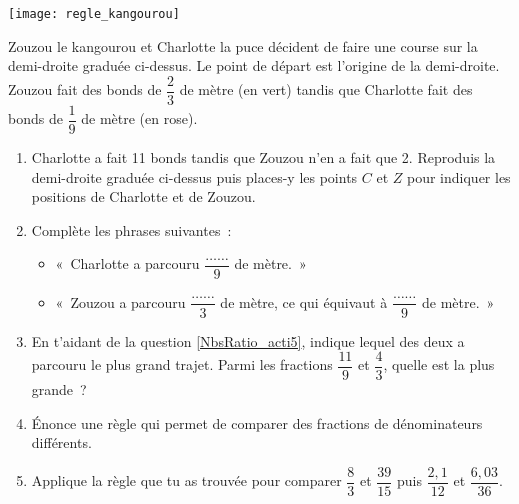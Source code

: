 \begin{activite}

\begin{center} \texttt{[image: regle\_kangourou]} \end{center}

Zouzou le kangourou et Charlotte la puce décident de faire une course sur la demi-droite graduée ci-dessus. Le point de départ est l'origine de la demi-droite. Zouzou fait des bonds de $\dfrac{2}{3}$ de mètre (en vert) tandis que Charlotte fait des bonds de $\dfrac{1}{9}$ de mètre (en rose).

\begin{enumerate}
 \item Charlotte a fait 11 bonds tandis que Zouzou n'en a fait que 2. Reproduis la demi-droite graduée ci-dessus puis places-y les points $C$ et $Z$ pour indiquer les positions de Charlotte et de Zouzou. 
 \item Complète les phrases suivantes : \label{NbsRatio_acti5}
 \begin{itemize}
  \item « Charlotte a parcouru $\dfrac{\ldots \ldots}{9}$ de mètre. »
  \vspace{0.2cm}
  \item « Zouzou a parcouru $\dfrac{\ldots \ldots}{3}$ de mètre, ce qui équivaut à $\dfrac{\ldots \ldots}{9}$ de mètre. »
  \end{itemize}
  \vspace{0.2cm}
 \item En t'aidant de la question \ref{NbsRatio_acti5}, indique lequel des deux a parcouru le plus grand trajet. Parmi les fractions $\dfrac{11}{9}$ et $\dfrac{4}{3}$, quelle est la plus grande ? 
 \item Énonce une règle qui permet de comparer des fractions de dénominateurs différents.
 \item Applique la règle que tu as trouvée pour comparer $\dfrac{8}{3}$ et $\dfrac{39}{15}$ puis $\dfrac{2,1}{12}$ et $\dfrac{6,03}{36}$.
 \end{enumerate}

\end{activite}


